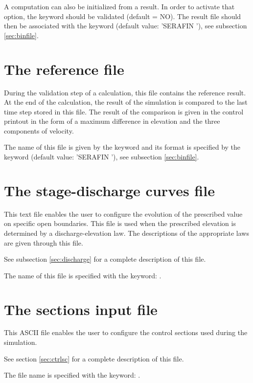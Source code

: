 A computation can also be initialized from a  result. In order to
activate that option, the  keyword
should be validated (default = NO).
The  result file should then be associated with
the  keyword (default
value: 'SERAFIN '), see subsection \ref{sec:binfile}.


\section{The reference file}

During the validation step of a calculation, this file contains the reference
result.
At the end of the calculation, the result of the simulation is compared to the
last time step stored in this file. The result of the comparison is given in
the control printout in the form of a maximum difference in elevation and the
three components of velocity.

The name of this file is given by the keyword  and its
format is specified by the keyword  (default
value: 'SERAFIN '), see subsection \ref{sec:binfile}.


\section{The stage-discharge curves file}

This text file enables the user to configure the evolution of the prescribed
value on specific open boundaries. This file is used when the prescribed
elevation is determined by a discharge-elevation law. The descriptions of the
appropriate laws are given through this file.

See subsection \ref{sec:discharge} for a complete description of this file.

The name of this file is specified with the keyword: .


\section{The sections input file}

This ASCII file enables the user to configure the control sections used
during the simulation.

See section \ref{sec:ctrlsc} for a complete description of this file.

The file name is specified with the keyword: .


